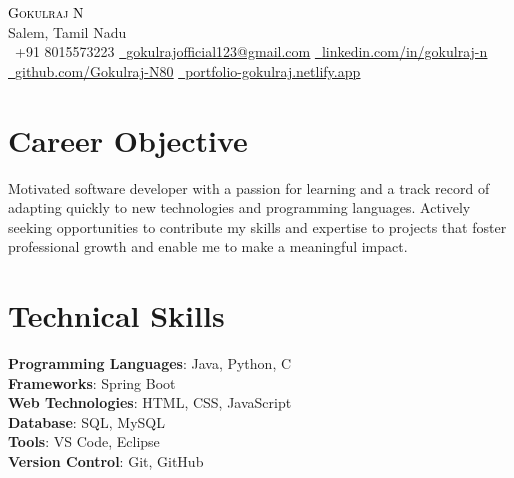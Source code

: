 \documentclass[letterpaper,11pt]{article}
\begin{document}
\begin{center}
        {\Huge \scshape \textcolor{black}{Gokulraj N}} \\ \vspace{1pt}
        Salem, Tamil Nadu \\ \vspace{1pt}
        \small \raisebox{-0.1\height}\faPhone\ +91 8015573223 \quad
        \href{mailto:gokulrajofficial123@gmail.com}{\raisebox{-0.2\height}\faEnvelope\  \underline{gokulrajofficial123@gmail.com}} \quad
        \href{https://www.linkedin.com/in/gokulraj-n-452438360/}{\raisebox{-0.2\height}\faLinkedin\ \underline{linkedin.com/in/gokulraj-n}} \\ \vspace{4pt}
        \href{https://github.com/Gokulraj-N80}{\raisebox{-0.2\height}\faGithub\ \underline{github.com/Gokulraj-N80}} \quad
        \href{https://portfolio-gokulraj.netlify.app/}{\raisebox{-0.2\height}\faGlobe\ \underline{portfolio-gokulraj.netlify.app}}
        \vspace{-8pt}
\end{center}

\section{Career Objective}
\small{
Motivated software developer with a passion for learning and a track record of adapting quickly to new technologies and programming languages. Actively seeking opportunities to contribute my skills and expertise to projects that foster professional growth and enable me to make a meaningful impact.
}
\vspace{-12pt}

\section{Technical Skills}
 \begin{itemize}[leftmargin=0.15in, label={}]
        \small{\item{
         \textbf{Programming Languages}{: Java, Python, C} \\
         \textbf{Frameworks}{: Spring Boot} \\
         \textbf{Web Technologies}{: HTML, CSS, JavaScript} \\
         \textbf{Database}{: SQL, MySQL} \\
         \textbf{Tools}{: VS Code, Eclipse} \\
         \textbf{Version Control}{: Git, GitHub}
        }}
 \end{itemize}
 \vspace{-16pt}
\end{document}
